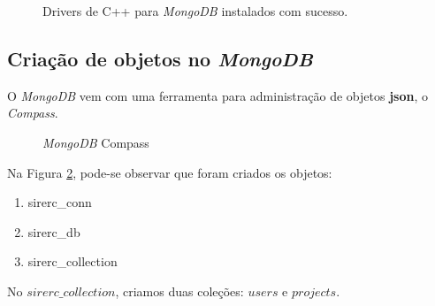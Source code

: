 \documentclass[a4paper,11pt]{article}
\newcommand{\mongo}{\textit{MongoDB}}
\begin{document}
\begin{figure}[H]
	\centering
	\caption{Drivers de C++ para \mongo{} instalados com sucesso.}\label{fig:mongodb_drivers}
\end{figure}

\subsection{Criação de objetos no \mongo{}}

O \mongo{} vem com uma ferramenta para administração de objetos \textbf{json}, o \textit{Compass}.
\begin{figure}[H]
	\centering
	\caption{\mongo{} Compass}\label{fig:mongo_compass}
\end{figure}

Na Figura \ref{fig:mongo_compass}, pode-se observar que foram criados os objetos:
\begin{enumerate}
\item sirerc\_conn
\item sirerc\_db
\item sirerc\_collection
\end{enumerate}

No $sirerc\_collection$, criamos duas coleções: $users$ e $projects$.
\end{document}
